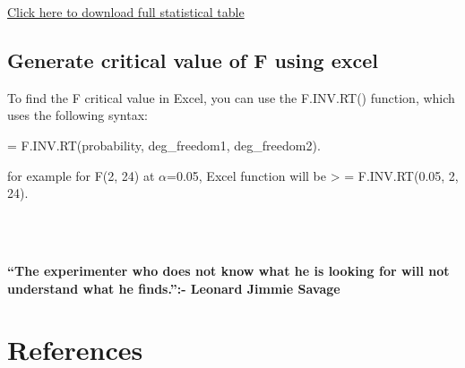 \documentclass[
]{book}
\begin{document}
\href{https://drive.google.com/file/d/1zN8fmmUFajNwGHFHyUz1K55FUL2PlArs/view?usp=sharing}{Click here to download full statistical table}

\hypertarget{generate-critical-value-of-f-using-excel}{%
\section{Generate critical value of F using excel}\label{generate-critical-value-of-f-using-excel}}

To find the F critical value in Excel, you can use the F.INV.RT() function, which uses the following syntax:

= F.INV.RT(probability, deg\_freedom1, deg\_freedom2).

for example for F(2, 24) at \(\alpha\)=0.05, Excel function will be
\textgreater{} = F.INV.RT(0.05, 2, 24).

~\\
\hspace*{0.333em}\\
\hspace*{0.333em}

\hypertarget{hello}{}
\textbf{``The experimenter who does not know what he is looking for will not understand what he finds.'':- Leonard Jimmie Savage}

\hypertarget{references}{%
\chapter*{References}\label{references}}

  
\end{document}
